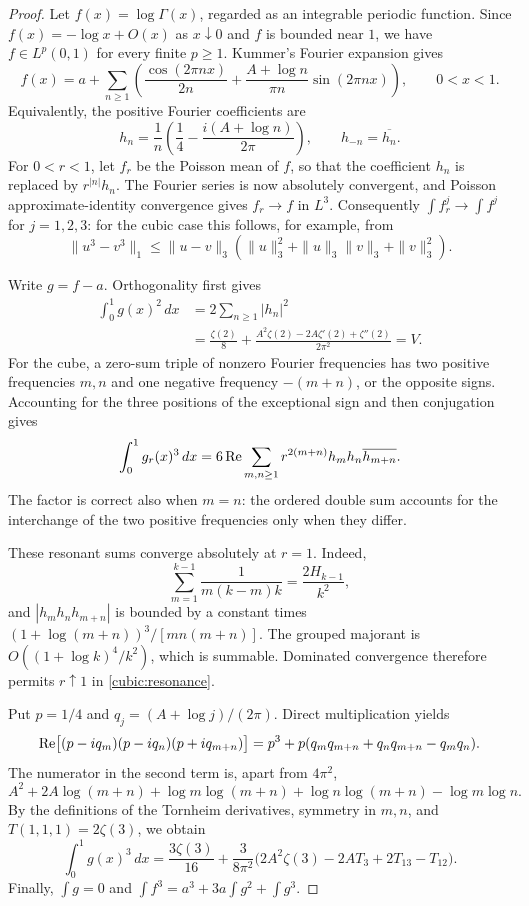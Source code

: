 \begin{proof}
Let $f(x)=\log\Gamma(x)$, regarded as an integrable periodic function.
Since $f(x)=-\log x+O(x)$ as $x\downarrow0$ and $f$ is bounded near $1$,
we have $f\in L^p(0,1)$ for every finite $p\ge1$.
Kummer's Fourier expansion gives
\[
 f(x)=a+\sum_{n\ge1}
 \left(\frac{\cos(2\pi nx)}{2n}
       +\frac{A+\log n}{\pi n}\sin(2\pi nx)\right),
 \qquad 0<x<1.
\]
Equivalently, the positive Fourier coefficients are
\[
 h_n=\frac1n\left(\frac14-
                   \frac{i(A+\log n)}{2\pi}\right),
 \qquad h_{-n}=\overline{h_n}.
\]
For $0<r<1$, let $f_r$ be the Poisson mean of $f$, so that the coefficient
$h_n$ is replaced by $r^{|n|}h_n$.  The Fourier series is now absolutely
convergent, and Poisson approximate-identity convergence gives
$f_r\to f$ in $L^3$.  Consequently $\int f_r^j\to\int f^j$ for $j=1,2,3$:
for the cubic case this follows, for example, from
\[
 \|u^3-v^3\|_1\le\|u-v\|_3
       (\|u\|_3^2+\|u\|_3\|v\|_3+\|v\|_3^2).
\]

Write $g=f-a$. Orthogonality first gives
\begin{align*}
 \int_0^1g(x)^2\,dx
 &=2\sum_{n\ge1}|h_n|^2\\
 &=\frac{\zeta(2)}8+
   \frac{A^2\zeta(2)-2A\zeta'(2)+\zeta''(2)}{2\pi^2}=V.
\end{align*}
For the cube, a zero-sum triple of nonzero Fourier frequencies has two
positive frequencies $m,n$ and one negative frequency $-(m+n)$, or the
opposite signs.  Accounting for the three positions of the exceptional
sign and then conjugation gives
\begin{equation}\label{cubic:resonance}
 \int_0^1g_r(x)^3\,dx
 =6\mathop{\rm Re}\sum_{m,n\ge1}
     r^{2(m+n)}h_mh_n\overline{h_{m+n}}.
\end{equation}
The factor is correct also when $m=n$: the ordered double sum accounts
for the interchange of the two positive frequencies only when they differ.

These resonant sums converge absolutely at $r=1$. Indeed,
\[
 \sum_{m=1}^{k-1}\frac1{m(k-m)k}
       =\frac{2H_{k-1}}{k^2},
\]
and $|h_mh_nh_{m+n}|$ is bounded by a constant times
$(1+\log(m+n))^3/[mn(m+n)]$.  The grouped majorant is
$O((1+\log k)^4/k^2)$, which is summable.  Dominated convergence therefore
permits $r\uparrow1$ in \eqref{cubic:resonance}.

Put $p=1/4$ and $q_j=(A+\log j)/(2\pi)$.  Direct multiplication yields
\[
 \mathop{\rm Re}\bigl[(p-iq_m)(p-iq_n)(p+iq_{m+n})\bigr]
 =p^3+p(q_mq_{m+n}+q_nq_{m+n}-q_mq_n).
\]
The numerator in the second term is, apart from $4\pi^2$,
\[
 A^2+2A\log(m+n)+\log m\log(m+n)+\log n\log(m+n)-\log m\log n.
\]
By the definitions of the Tornheim derivatives, symmetry in $m,n$,
and $T(1,1,1)=2\zeta(3)$, we obtain
\[
 \int_0^1g(x)^3\,dx
 =\frac{3\zeta(3)}{16}
 +\frac{3}{8\pi^2}
       \bigl(2A^2\zeta(3)-2AT_3+2T_{13}-T_{12}\bigr).
\]
Finally, $\int g=0$ and $\int f^3=a^3+3a\int g^2+\int g^3$.
\end{proof}

